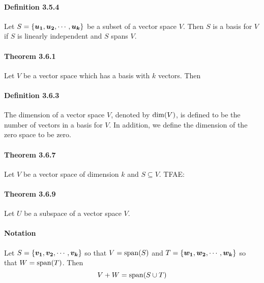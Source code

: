 \documentclass[a4paper]{article}
\begin{document}
\begin{multicols*}{3}
    \paragraph{Definition 3.5.4} Let $S = \vset{\u[1], \u[2], \cdots, \u[k]}$ be a subset of a vector space $V$. Then $S$ is a basis for $V$ if $S$ is linearly independent and $S$ spans $V$.
    \paragraph{Theorem 3.6.1} Let $V$ be a vector space which has a basis with $k$ vectors. Then
    \paragraph{Definition 3.6.3} The dimension of a vector space $V$, denoted by $\matdim{V}$, is defined to be the number of vectors in a basis for $V$. In addition, we define the dimension of the zero space to be zero.
    \paragraph{Theorem 3.6.7} Let $V$ be a vector space of dimension $k$ and $S \subseteq V$. TFAE:
      \paragraph{Theorem 3.6.9} Let $U$ be a subspace of a vector space $V$.
    \paragraph{Notation} Let $S = \{\v[1], \v[2], \cdots, \v[k]\}$ so that $V = \spn{S}$ and $T = \{\w[1], \w[2], \cdots, \w[k]\}$ so that $W = \spn{T}$. Then
        \begin{equation*}
          V + W = \spn{S \cup T}
        \end{equation*}

\end{multicols*}
\end{document}
